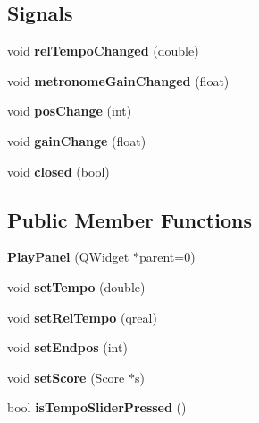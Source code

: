 \subsection*{Signals}
\begin{DoxyCompactItemize}
\item 
\mbox{\label{class_ms_1_1_play_panel_a7e9334a4b4ed7d9ef023d65c3bb3216b}} 
void {\bfseries rel\+Tempo\+Changed} (double)
\item 
\mbox{\label{class_ms_1_1_play_panel_ae7c41b104c9384186bf63e813f33f082}} 
void {\bfseries metronome\+Gain\+Changed} (float)
\item 
\mbox{\label{class_ms_1_1_play_panel_afb5aaf7b10a46798e841a043cfb23f97}} 
void {\bfseries pos\+Change} (int)
\item 
\mbox{\label{class_ms_1_1_play_panel_aa848e2b722735c7eb45d97b029106b41}} 
void {\bfseries gain\+Change} (float)
\item 
\mbox{\label{class_ms_1_1_play_panel_aaa2b90fce39babd7f2223575c29680aa}} 
void {\bfseries closed} (bool)
\end{DoxyCompactItemize}
\subsection*{Public Member Functions}
\begin{DoxyCompactItemize}
\item 
\mbox{\label{class_ms_1_1_play_panel_a66d705261f6c349727d3b7baf32dfcf1}} 
{\bfseries Play\+Panel} (Q\+Widget $\ast$parent=0)
\item 
\mbox{\label{class_ms_1_1_play_panel_a4019dcc1081389996c89d3d7e9dd7d03}} 
void {\bfseries set\+Tempo} (double)
\item 
\mbox{\label{class_ms_1_1_play_panel_a11f7cf96bf1c95acc161ed7d90ffabd1}} 
void {\bfseries set\+Rel\+Tempo} (qreal)
\item 
\mbox{\label{class_ms_1_1_play_panel_a539d338ba33fd8b28cf25e51312f2e71}} 
void {\bfseries set\+Endpos} (int)
\item 
\mbox{\label{class_ms_1_1_play_panel_a2da033b321352fc2070b07bad0168400}} 
void {\bfseries set\+Score} (\hyperlink{class_ms_1_1_score}{Score} $\ast$s)
\item 
\mbox{\label{class_ms_1_1_play_panel_a430dc286a49447a9174b700bb6d2b850}} 
bool {\bfseries is\+Tempo\+Slider\+Pressed} ()
\end{DoxyCompactItemize}
